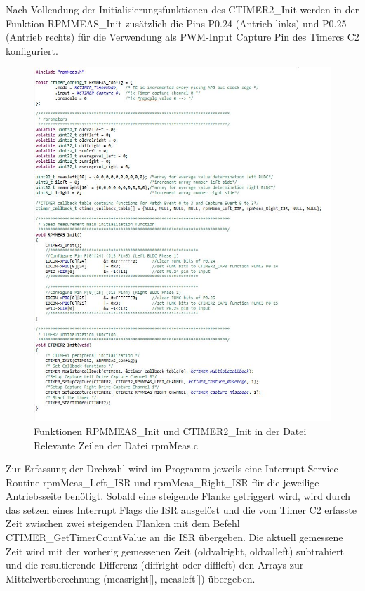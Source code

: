 Nach Vollendung der Initialisierungsfunktionen des CTIMER2\_Init werden in der Funktion RPMMEAS\_Init zusätzlich die Pins P0.24 (Antrieb links) und P0.25 (Antrieb rechts) für die Verwendung als PWM-Input Capture Pin des Timercs C2 konfiguriert.

\begin{figure}[H] %
\includegraphics[width=.90\textwidth]{sec4/images/rpmmeas_init_ctimer2_init} 
\centering
\captionsetup{width=.95\textwidth}
\caption[rpmmeas\_init\_ctimer2\_init]{Funktionen RPMMEAS\_Init und CTIMER2\_Init in der Datei Relevante Zeilen der Datei \glqq{}rpmMeas.c\grqq{}}\centering
\label{fig:rpmmeasInitCtimer2Init}
\end{figure}


Zur Erfassung der Drehzahl wird im Programm jeweils eine Interrupt Service Routine rpmMeas\_Left\_ISR und rpmMeas\_Right\_ISR für die jeweilige Antriebsseite benötigt. Sobald eine steigende Flanke getriggert wird, wird durch das setzen eines Interrupt Flags die ISR ausgelöst und die vom Timer C2 erfasste Zeit zwischen zwei steigenden Flanken mit dem Befehl CTIMER\_GetTimerCountValue an die ISR übergeben. Die aktuell gemessene Zeit wird mit der vorherig gemessenen Zeit (oldvalright, oldvalleft) subtrahiert und die resultierende Differenz (diffright oder diffleft) den Arrays zur Mittelwertberechnung (measright[], measleft[]) übergeben.\vspace{11pt}  


